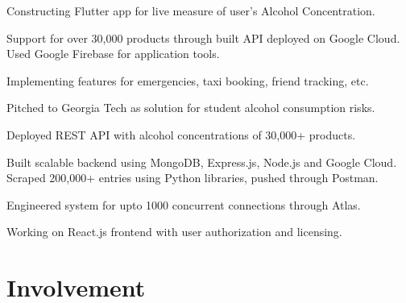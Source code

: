 \documentclass[]{saumya-resume}
\begin{document}
\begin{minipage}[t]{0.66\textwidth}
\begin{tightemize}
\item Constructing Flutter app for live measure of user's Alcohol Concentration.
\item Support for over 30,000 products through built API deployed on Google Cloud. Used Google Firebase for application tools.
\item Implementing features for emergencies, taxi booking, friend tracking, etc.
\item Pitched to Georgia Tech as solution for student alcohol consumption risks.
\end{tightemize}
\sectionsep

\begin{tightemize}
\item Deployed REST API with alcohol concentrations of 30,000+ products.
\item Built scalable backend using MongoDB, Express.js, Node.js and Google Cloud. Scraped 200,000+ entries using Python libraries, pushed through Postman.
\item Engineered system for upto 1000 concurrent connections through Atlas.
\item Working on React.js frontend with user authorization and licensing.
\end{tightemize}
\sectionsep

\begin{tightemize}

\end{tightemize}
\sectionsep


\section{Involvement} 
\renewcommand\refname{\vskip -1.5em} %


\nocite{*}

\end{minipage} 
\end{document}
